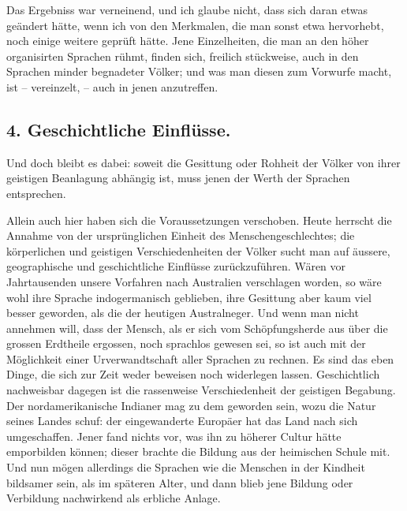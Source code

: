 Das Ergebniss war verneinend, und ich glaube nicht, dass sich daran etwas geändert hätte, wenn ich von den Merkmalen, die man sonst etwa hervorhebt, noch einige weitere geprüft hätte. Jene Einzelheiten, die man an den höher organisirten Sprachen rühmt, finden sich, freilich stückweise, auch in den Sprachen minder begnadeter Völker; und was man diesen zum Vorwurfe macht, ist – vereinzelt, – auch in jenen anzutreffen.

\label{sp.395}

\subsection*{4. Geschichtliche Einflüsse.}\label{IV.IV.4}

Und doch bleibt es dabei: soweit die Gesittung oder Rohheit der Völker von ihrer geistigen Beanlagung abhängig ist, muss jenen der Werth der Sprachen entsprechen.

Allein auch hier haben sich die Voraussetzungen verschoben. Heute herrscht die Annahme von der ursprünglichen Einheit des Menschengeschlechtes; die körperlichen und geistigen Verschiedenheiten der Völker sucht man auf äussere, geographische und geschichtliche Einflüsse zurückzuführen. Wären vor Jahrtausenden unsere Vorfahren nach Australien verschlagen worden, so wäre wohl ihre Sprache indogermanisch geblieben, ihre Gesittung aber kaum viel besser geworden, als die der heutigen Australneger. Und wenn man nicht annehmen will, dass der Mensch, als er sich vom Schöpfungsherde aus über die grossen Erdtheile ergossen, noch sprachlos gewesen sei, so ist auch mit der Möglichkeit einer Urverwandtschaft aller Sprachen zu rechnen. Es sind das eben Dinge, \label{fp.377} die sich zur Zeit weder beweisen noch widerlegen lassen. Geschichtlich nachweisbar dagegen ist die rassenweise Verschiedenheit der geistigen Begabung. Der nordamerikanische Indianer mag zu dem geworden sein, wozu  die Natur seines Landes schuf: der eingewanderte Europäer hat das Land nach sich umgeschaffen. Jener fand nichts vor, was ihn zu höherer Cultur hätte emporbilden können; dieser brachte die Bildung aus der heimischen Schule mit. Und nun mögen allerdings die Sprachen wie die Menschen in der Kindheit bildsamer sein, als im späteren Alter, und dann blieb jene Bildung oder Verbildung nachwirkend als erbliche Anlage.

